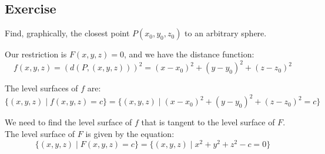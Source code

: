 \documentclass[11pt]{article}
\begin{document}
\subsection*{Exercise}
Find, graphically, the closest point $P(x_0, y_0, z_0)$ to an arbitrary sphere.

Our restriction is $F(x,y,z) = 0$, and we have the distance function:
\[f(x,y,z) = \left(d (P, (x,y,z))\right)^2 = (x - x_0)^2 + (y - y_0)^2 + (z - z_0)^2\]

The level surfaces of $f$ are:
\[
\{ (x,y,z) \mid f(x,y,z) = c \} = \{ (x,y,z) \mid (x - x_0)^2 + (y - y_0)^2 + (z - z_0)^2 = c \}
\]

We need to find the level surface of $f$ that is tangent to the level surface of $F$. The level surface of $F$ is given by the equation:
\[
\{ (x,y,z) \mid F(x,y,z) = c \} = \{ (x,y,z) \mid x^2 + y^2 + z^2 - c = 0 \}
\]
\end{document}
